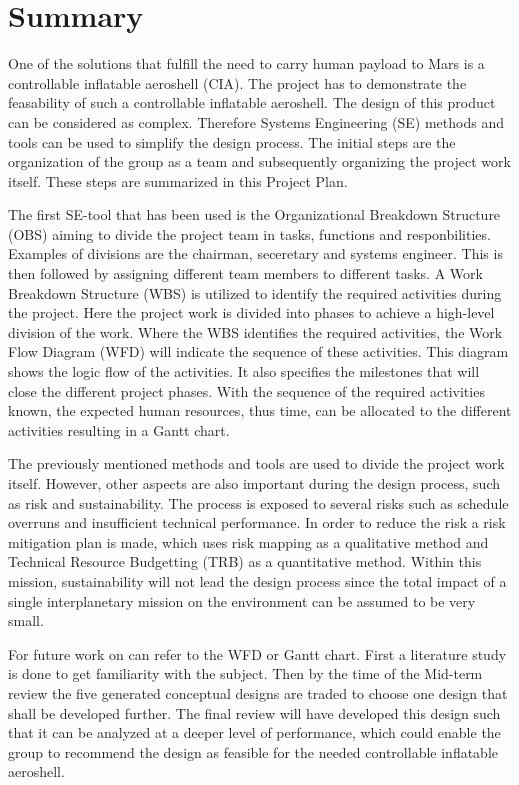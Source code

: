 \section*{Summary}\label{cha:summary}
One of the solutions that fulfill the need to carry human payload to Mars is a controllable inflatable aeroshell (CIA). The project has to demonstrate the feasability of such a controllable inflatable aeroshell. The design of this product can be considered as complex. Therefore Systems Engineering (SE) methods and tools can be used to simplify the design process. The initial steps are the organization of the group as a team and subsequently organizing the project work itself. These steps are summarized in this Project Plan.

The first SE-tool that has been used is the Organizational Breakdown Structure (OBS) aiming to divide the project team in tasks, functions and responbilities. Examples of divisions are the chairman, seceretary and systems engineer. This is then followed by assigning different team members to different tasks. A Work Breakdown Structure (WBS) is utilized to identify the required activities during the project. Here the project work is divided into phases to achieve a high-level division of the work. Where the WBS identifies the required activities, the Work Flow Diagram (WFD) will indicate the sequence of these activities. This diagram shows the logic flow of the activities. It also specifies the milestones that will close the different project phases. With the sequence of the required activities known, the expected human resources, thus time, can be allocated to the different activities resulting in a Gantt chart. 

The previously mentioned methods and tools are used to divide the project work itself. However, other aspects are also important during the design process, such as risk and sustainability. The process is exposed to several risks such as schedule overruns and insufficient technical performance. In order to reduce the risk a risk mitigation plan is made, which uses risk mapping as a qualitative method and Technical Resource Budgetting (TRB) as a quantitative method. Within this mission, sustainability will not lead the design process since the total impact of a single interplanetary mission on the environment can be assumed to be very small.

For future work on can refer to the WFD or Gantt chart. First a literature study is done to get familiarity with the subject. Then by the time of the Mid-term review the five generated conceptual designs are traded to choose one design that shall be developed further. The final review will have developed this design such that it can be analyzed at a deeper level of performance, which could enable the group to recommend the design as feasible for the needed controllable inflatable aeroshell.